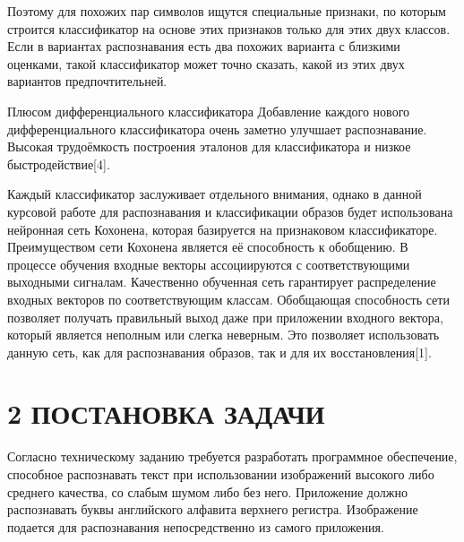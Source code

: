 \documentclass[14pt,a4paper]{extreport}
\begin{document}
\hspace{4ex} Поэтому для похожих пар символов ищутся специальные признаки, по которым строится классификатор на основе этих признаков только для этих двух классов. Если в вариантах распознавания есть два похожих варианта с близкими оценками, такой классификатор может точно сказать, какой из этих двух вариантов предпочтительней.\

\hspace{4ex} Плюсом дифференциального классификатора Добавление каждого нового дифференциального классификатора очень заметно улучшает распознавание. Высокая трудоёмкость построения эталонов для классификатора и низкое быстродействие[4].\

\hspace{4ex} Каждый классификатор заслуживает отдельного внимания, однако в данной курсовой работе для распознавания и классификации образов будет использована нейронная сеть Кохонена, которая базируется на признаковом классификаторе. Преимуществом сети Кохонена является её способность к обобщению. В процессе обучения входные векторы ассоциируются с соответствующими выходными сигналам. Качественно обученная сеть гарантирует распределение входных векторов по соответствующим классам. Обобщающая способность сети позволяет получать правильный выход даже при приложении входного вектора, который является неполным или слегка неверным. Это позволяет использовать данную сеть, как для распознавания образов, так и для их восстановления[1].\




         
	\newpage
	\section*{\normalsize\hspace{2ex}2 ПОСТАНОВКА ЗАДАЧИ}

\hspace{4ex} Согласно техническому заданию требуется разработать программное обеспечение, способное распознавать текст при использовании изображений высокого либо среднего качества, со слабым шумом либо без него. Приложение должно распознавать буквы английского алфавита верхнего регистра. Изображение подается для распознавания непосредственно из самого приложения.




	\newpage
\end{document}
